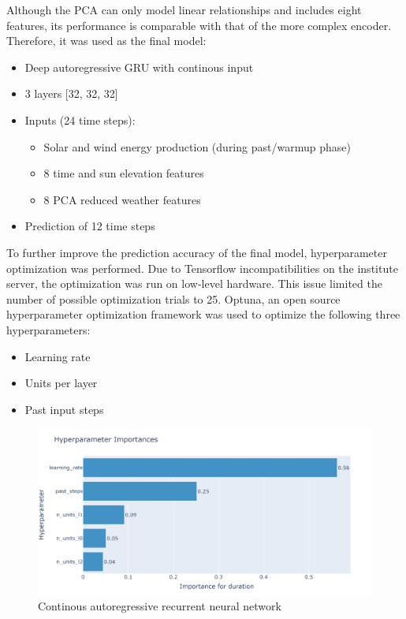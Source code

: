 \documentclass[11pt,table]{article}
\begin{document}
Although the PCA can only model linear relationships and includes eight features, its performance is comparable with that of the more complex encoder. Therefore, it was used as the final model:
\begin{itemize}
\item Deep autoregressive GRU with continous input
\item 3 layers [32, 32, 32]
\item Inputs (24 time steps):
\begin{itemize}
\item Solar and wind energy production (during past/warmup phase)
\item 8 time and sun elevation features
\item 8 PCA reduced weather features
\end{itemize}
\item Prediction of 12 time steps 
\end{itemize}

To further improve the prediction accuracy of the final model, hyperparameter optimization was performed. Due to Tensorflow incompatibilities on the institute server, the optimization was run on low-level hardware. This issue limited the number of possible optimization trials to 25. Optuna, an open source hyperparameter optimization framework was used to optimize the following three hyperparameters: 
\begin{itemize}
\item Learning rate
\item Units per layer
\item Past input steps
\end{itemize}

\begin{figure}[H]
	\centering
	\includegraphics[scale=1]{Figures/optimImportance.png}
	\caption{Continous autoregressive recurrent neural network}
	\label{fig:continousARNN}
\end{figure}
\end{document}
